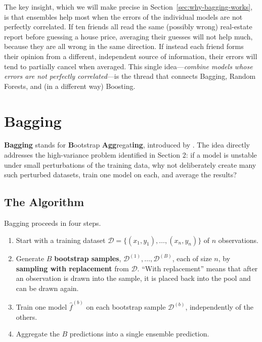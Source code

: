 \documentclass[12pt,a4paper]{article}
\begin{document}
The key insight, which we will make precise in Section~\ref{sec:why-bagging-works}, is that ensembles help most when the errors of the individual models are not perfectly correlated. If ten friends all read the same (possibly wrong) real-estate report before guessing a house price, averaging their guesses will not help much, because they are all wrong in the same direction. If instead each friend forms their opinion from a different, independent source of information, their errors will tend to partially cancel when averaged. This single idea---\emph{combine models whose errors are not perfectly correlated}---is the thread that connects Bagging, Random Forests, and (in a different way) Boosting.

\section{Bagging}

\textbf{Bagging} stands for \textbf{B}ootstrap \textbf{Agg}regat\textbf{ing}, introduced by \citet{breiman1996bagging}. The idea directly addresses the high-variance problem identified in Section 2: if a model is unstable under small perturbations of the training data, why not deliberately create many such perturbed datasets, train one model on each, and average the results?

\subsection{The Algorithm}

Bagging proceeds in four steps.

\begin{enumerate}
    \item Start with a training dataset $\mathcal{D} = \{(x_1, y_1), \ldots, (x_n, y_n)\}$ of $n$ observations.
    \item Generate $B$ \textbf{bootstrap samples}, $\mathcal{D}^{(1)}, \ldots, \mathcal{D}^{(B)}$, each of size $n$, by \textbf{sampling with replacement} from $\mathcal{D}$. ``With replacement'' means that after an observation is drawn into the sample, it is placed back into the pool and can be drawn again.
    \item Train one model $\hat f^{(b)}$ on each bootstrap sample $\mathcal{D}^{(b)}$, independently of the others.
    \item Aggregate the $B$ predictions into a single ensemble prediction.
\end{enumerate}
\end{document}
